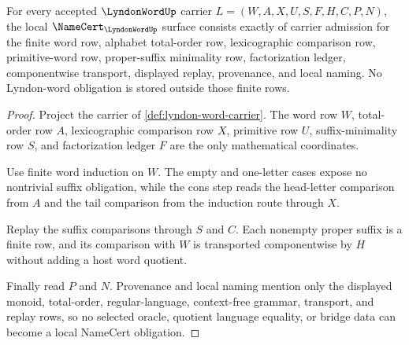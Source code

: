 \begin{theorem}
\label{thm:lyndon-word-namecert-obligations}
For every accepted $\LyndonWordUp$ carrier $L=(W,A,X,U,S,F,H,C,P,N)$, the local $\NameCert_{\LyndonWordUp}$ surface consists exactly of carrier admission for the finite word row, alphabet total-order row, lexicographic comparison row, primitive-word row, proper-suffix minimality row, factorization ledger, componentwise transport, displayed replay, provenance, and local naming. No Lyndon-word obligation is stored outside those finite rows.
\end{theorem}
\begin{proof}
Project the carrier of \autoref{def:lyndon-word-carrier}. The word row $W$, total-order row $A$, lexicographic comparison row $X$, primitive row $U$, suffix-minimality row $S$, and factorization ledger $F$ are the only mathematical coordinates.

Use finite word induction on $W$. The empty and one-letter cases expose no nontrivial suffix obligation, while the cons step reads the head-letter comparison from $A$ and the tail comparison from the induction route through $X$.

Replay the suffix comparisons through $S$ and $C$. Each nonempty proper suffix is a finite row, and its comparison with $W$ is transported componentwise by $H$ without adding a host word quotient.

Finally read $P$ and $N$. Provenance and local naming mention only the displayed monoid, total-order, regular-language, context-free grammar, transport, and replay rows, so no selected oracle, quotient language equality, or bridge data can become a local NameCert obligation.
\end{proof}

